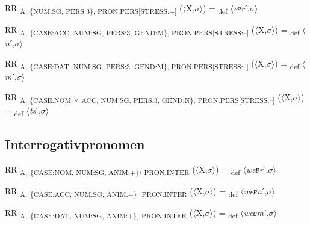 {\begin{exe}
 RR \textsubscript{A, \{NUM:SG, PERS:3\}, PRON.PERS[STRESS:+]} ($\langle$X,$\sigma $$\rangle$) = \textsubscript{def} $\langle$\textit{eɐr}ˊ,$\sigma $$\rangle$
\end{exe}

\begin{exe}
 RR \textsubscript{A, \{CASE:ACC, NUM:SG, PERS:3, GEND:M\}, PRON.PERS[STRESS:–]} ($\langle$X,$\sigma $$\rangle$) = \textsubscript{def} $\langle$\textit{n}ˊ,$\sigma $$\rangle$
\end{exe}

\begin{exe}
 RR \textsubscript{A, \{CASE:DAT, NUM:SG, PERS:3, GEND:M\}, PRON.PERS[STRESS:–]} ($\langle$X,$\sigma $$\rangle$) = \textsubscript{def} $\langle$\textit{m}ˊ,$\sigma $$\rangle$
\end{exe}

\begin{exe}
 RR \textsubscript{A, \{CASE:NOM} \textsubscript{${\veebar}$}\textsubscript{ ACC, NUM:SG, PERS:3, GEND:N\}, PRON.PERS[STRESS:–]} ($\langle$X,$\sigma $$\rangle$) = \textsubscript{def} $\langle$\textit{ts}ˊ,$\sigma $$\rangle$
\end{exe}

\subsection{Interrogativpronomen}

\begin{exe}
 RR \textsubscript{A,} \textsubscript{\{CASE:NOM, NUM:SG, ANIM:+\}}, \textsubscript{PRON.INTER} ($\langle$X,$\sigma $$\rangle$) = \textsubscript{def} $\langle$\textit{weɐr}ˊ,$\sigma $$\rangle$
\end{exe}

\begin{exe}
 RR \textsubscript{A,} \textsubscript{\{CASE:ACC, NUM:SG, ANIM:+\},} \textsubscript{PRON.INTER} ($\langle$X,$\sigma $$\rangle$) = \textsubscript{def} $\langle$\textit{weɐn}ˊ,$\sigma $$\rangle$
\end{exe}

\begin{exe}
 RR \textsubscript{A,} \textsubscript{\{CASE:DAT, NUM:SG, ANIM:+\},} \textsubscript{PRON.INTER} ($\langle$X,$\sigma $$\rangle$) = \textsubscript{def} $\langle$\textit{weɐm}ˊ,$\sigma $$\rangle$
\end{exe}

}
